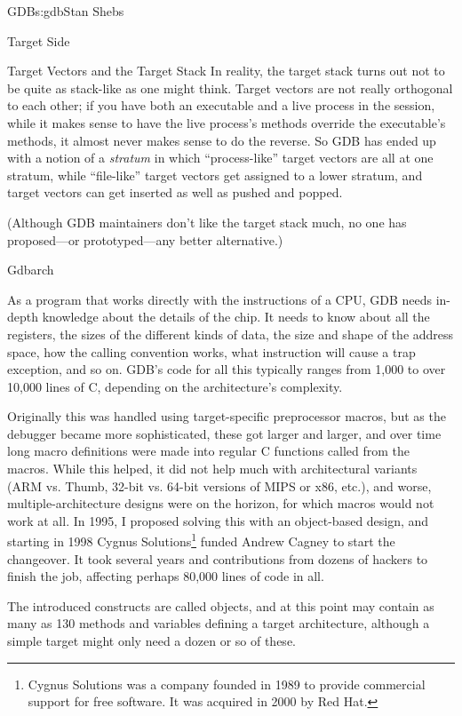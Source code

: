 \begin{aosachapter}{GDB}{s:gdb}{Stan Shebs}
\begin{aosasect1}{Target Side}
\begin{aosasect2}{Target Vectors and the Target Stack}
In reality, the target stack turns out not to be quite as stack-like
as one might think.  Target vectors are not really orthogonal to each
other; if you have both an executable and a live process in the
session, while it makes sense to have the live process's methods
override the executable's methods, it almost never makes sense to do
the reverse.  So GDB has ended up with a notion of a {\em stratum} in
which ``process-like'' target vectors are all at one stratum, while
``file-like'' target vectors get assigned to a lower stratum, and
target vectors can get inserted as well as pushed and popped.

(Although GDB maintainers don't like the target stack much, no one has
proposed---or prototyped---any better alternative.)

\end{aosasect2}

\begin{aosasect2}{Gdbarch}

As a program that works directly with the instructions of a CPU, GDB
needs in-depth knowledge about the details of the chip.  It needs to
know about all the registers, the sizes of the different kinds of
data, the size and shape of the address space, how the calling
convention works, what instruction will cause a trap exception, and so
on.  GDB's code for all this typically ranges from 1,000 to over
10,000 lines of C, depending on the architecture's complexity.

Originally this was handled using target-specific preprocessor macros,
but as the debugger became more sophisticated, these got larger and
larger, and over time long macro definitions were made into regular C
functions called from the macros.  While this helped, it did not help
much with architectural variants (ARM vs. Thumb, 32-bit vs. 64-bit
versions of MIPS or x86, etc.), and worse, multiple-architecture
designs were on the horizon, for which macros would not work at all.
In 1995, I proposed solving this with an object-based design, and
starting in 1998 Cygnus Solutions\footnote{Cygnus Solutions was a company founded in 1989 to provide commercial support for free software. It was acquired in 2000 by Red Hat.} funded Andrew Cagney to start the
changeover.  It took several years and contributions from dozens of
hackers to finish the job, affecting perhaps 80,000 lines of code in
all.

The introduced constructs are called  objects, and at
this point may contain as many as 130 methods and variables defining a
target architecture, although a simple target might only need a dozen
or so of these.


\end{aosasect2}
\end{aosasect1}
\end{aosachapter}
